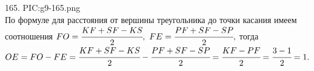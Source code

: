 165. {{PIC:g9-165.png}}\\
По формуле для расстояния от вершины треугольника до точки касания имеем соотношения $FO=\cfrac{KF+SF-KS}{2},\ FE=\cfrac{PF+SF-SP}{2},$ тогда\\
$OE=FO-FE=\cfrac{KF+SF-KS}{2}-\cfrac{PF+SF-SP}{2}=\cfrac{KF-PF}{2}=\cfrac{3-1}{2}=1.$\\
